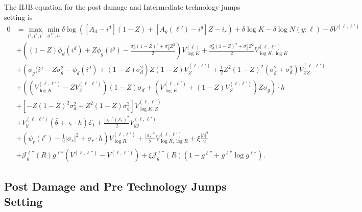 \documentclass[12pt]{article}
\begin{document}
\begin{appendices}
The HJB equation for the post damage and Intermediate technology jumps setting is
\begin{equation*}
\begin{split}
0 & = \max_{i^{g},i^{d},i^{r}} \min_{g^{\ell'}, h} \delta\log([A_{d}-i^{d}](1-Z)+[A_{g}(\ell')-i^{g}]Z -i_{r}) + \delta \log K - \delta \log N(y; \ell) - \delta V^{(\ell,\ell')} \\
& + \left((1-Z) \phi_d(i^{d}) +Z \phi_g(i^{g}) -\frac{   \sigma_d^2 (1-Z)^2 + \sigma_g^2 Z^2 }{2} \right)V^{(\ell)}_{\log K} + \frac{  \sigma_d^2 (1-Z)^2 + \sigma_g^2 Z^2}{2} V^{(\ell,\ell')}_{\log K,  \log K}  \\
 & +\left( \phi_g(i^{g} - Z \sigma_g^2 - \phi_d(i^{d}) + (1-Z) \sigma_d^2  \right) Z (1-Z) V^{(\ell,\ell')}_{Z} + \frac{1}{2} Z^2 (1-Z)^2 ({ \sigma_g^2 + \sigma_d^2} ) V^{(\ell,\ell')}_{ZZ} \\
 & + \left( \left( V^{(\ell,\ell')}_{\log K} -  Z V^{(\ell,\ell')}_{Z} \right) (1-Z) \sigma_d  + \left( V^{(\ell,\ell')}_{\log K} + (1-Z) V^{(\ell,\ell')}_{Z} \right)  Z \sigma_g \right) \cdot h \\
  & + \left[-Z(1-Z)^2\sigma_d^2 + Z^2(1-Z)\sigma_g^2\right]V^{(\ell,\ell')}_{\log K, Z} \\
 & + V^{(\ell,\ell')}_{y} (\bar{\theta} + \varsigma \cdot h) \mathcal{E}_t +\frac{|\varsigma|^{2}( \mathcal{E}_t)^{2}}{2} V^{(\ell,\ell')}_{yy} \\
  & +\left(\psi_{r}(i^{r})-\frac{1}{2}|\sigma_{r}|^{2} + \sigma_{r} \cdot h \right) V^{(\ell,\ell')}_{\log R}  +\frac{|\sigma_{r}|^{2}}{2}V^{(\ell,\ell')}_{\log R,\log R} + \xi \frac{|h|^2}{2} \\
 & + \mathcal{J}^{\ell''}_g(R) g^{\ell''} (V^{(\ell,\ell'')}-V^{(\ell,\ell')}) + \xi \mathcal{J}^{\ell''}_g(R) \left( 1 - g^{\ell''} + g^{\ell''} \log g^{\ell''} \right).
\end{split}
\end{equation*}



\subsection{Post Damage and Pre Technology Jumps Setting}


\end{appendices}
\end{document}
